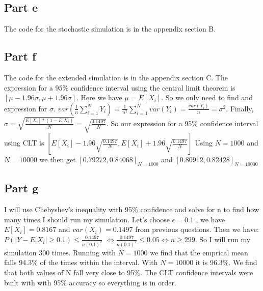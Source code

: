 \documentclass[10pt]{article}
\begin{document}
\subsection*{Part e}
The code for the stochastic simulation is in the appendix section B. 

\subsection*{Part f}
The code for the extended simulation is in the appendix section C.
The expression for a 95\% confidence interval using the central limit theorem is $[\mu − 1.96\sigma, \mu + 1.96\sigma]$.
Here we have $ \mu = E[X_{i}] $. So we only need to find and expression for $ \sigma $.
$ var(\frac{1}{n} \sum_{i=1}^N Y_{i}) = \frac{1}{n^2} \sum_{i=1}^N var(Y_{i}) = \frac{var(Y_{i})}{n} = \sigma^2$.
Finally, $ \sigma = \sqrt{\frac{E[X_{i}] * (1 - E[X_{i})}{N}} = \sqrt{\frac{0.1497}{N}} $. So our expression for
a 95\% confidence interval using CLT is $[E[X_{i}] − 1.96\sqrt{\frac{0.1497}{N}}, E[X_{i}] + 1.96\sqrt{\frac{0.1497}{N}}]$
Using $ N = 1000 $ and $ N = 10000 $ we then get $ [0.79272, 0.84068]_{N=1000} $ and $ [0.80912, 0.82428]_{N=10000} $ 


\subsection*{Part g}
I will use Chebyshev's inequality with 95\% confidence and solve for n to find how many times I should run
my simulation. Let's choose $\epsilon = 0.1 $ , we have $ E[X_{i}] = 0.8167 $ and $ var(X_{i}) = 0.1497$
from previous questions. Then we have: $ P(|Y - E[X_{i}| \geq 0.1) \leq \frac{0.1497}{n(0.1)^2} $
$\Leftrightarrow \frac{0.1497}{n(0.1)^2} \leq 0.05 \Leftrightarrow n \geq 299$. So I will run my simulation 300 times.
Running with $ N = 1000 $ we find that the emprical mean falls 94.3\% of the times within the interval. With 
$ N = 10000 $ it is 96.3\%. We find that both values of N fall very close to 95\%.
The CLT confidence intervals were built with with 95\% accuracy so everything is in order.
\end{document}
